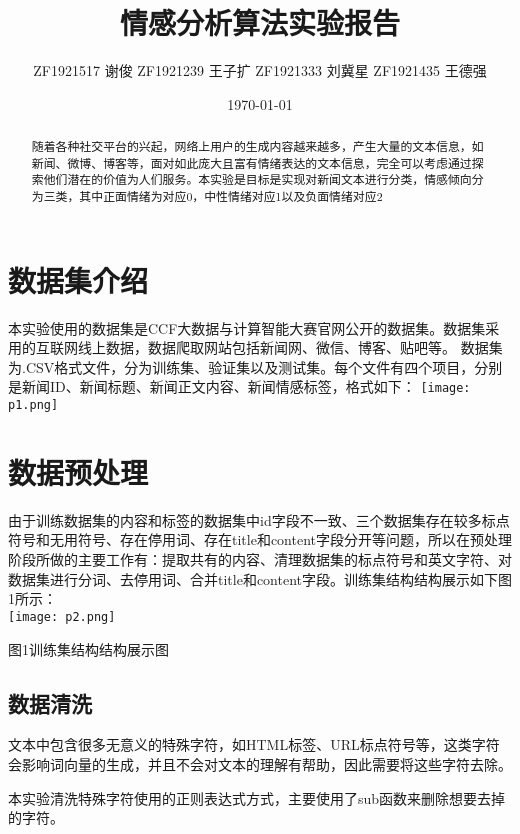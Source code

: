 \documentclass[twocolumn]{ctexart}
\begin{document}
\title{情感分析算法实验报告}
\author{ZF1921517 谢俊 ZF1921239 王子扩 ZF1921333 刘冀星 ZF1921435 王德强}
\date{\today}
\maketitle



\begin{abstract}
随着各种社交平台的兴起，网络上用户的生成内容越来越多，产生大量的文本信息，如新闻、微博、博客等，面对如此庞大且富有情绪表达的文本信息，完全可以考虑通过探索他们潜在的价值为人们服务。本实验是目标是实现对新闻文本进行分类，情感倾向分为三类，其中正面情绪为对应0，中性情绪对应1以及负面情绪对应2
\end{abstract}



\section{数据集介绍}

本实验使用的数据集是CCF大数据与计算智能大赛官网公开的数据集。数据集采用的互联网线上数据，数据爬取网站包括新闻网、微信、博客、贴吧等。
数据集为.CSV格式文件，分为训练集、验证集以及测试集。每个文件有四个项目，分别是新闻ID、新闻标题、新闻正文内容、新闻情感标签，格式如下：
\texttt{[image: p1.png]}


\section{数据预处理}
由于训练数据集的内容和标签的数据集中id字段不一致、三个数据集存在较多标点符号和无用符号、存在停用词、存在title和content字段分开等问题，所以在预处理阶段所做的主要工作有：提取共有的内容、清理数据集的标点符号和英文字符、对数据集进行分词、去停用词、合并title和content字段。训练集结构结构展示如下图1所示：\\
\texttt{[image: p2.png]}
\caption{图1训练集结构结构展示图}
\label{fig:label}

\subsection{数据清洗}
\par 文本中包含很多无意义的特殊字符，如HTML标签、URL标点符号等，这类字符会影响词向量的生成，并且不会对文本的理解有帮助，因此需要将这些字符去除。

\par 本实验清洗特殊字符使用的正则表达式方式，主要使用了sub函数来删除想要去掉的字符。
\end{document}
